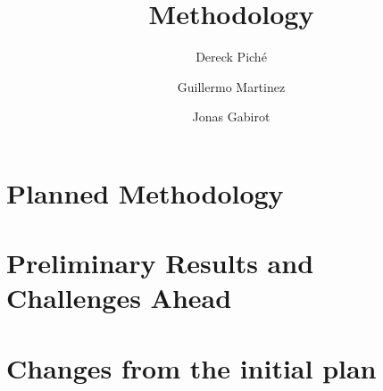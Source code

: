 \documentclass{article}
\title{Methodology}
\author
{
    Dereck Piché \and
    Guillermo Martinez \and
    Jonas Gabirot \and
}
\begin{document}
\maketitle

\section{Planned Methodology}

\section{Preliminary Results and Challenges Ahead}

\section{Changes from the initial plan}
\end{document}
